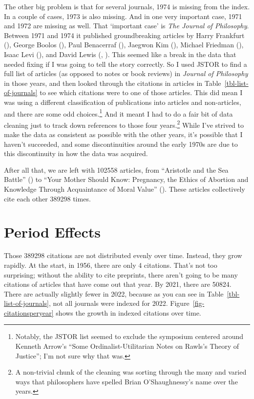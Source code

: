 \documentclass[
  10pt,
  letterpaper,
  DIV=11,
  numbers=noendperiod,
  twoside]{scrartcl}
\begin{document}
The other big problem is that for several journals, 1974 is missing from
the index. In a couple of cases, 1973 is also missing. And in one very
important case, 1971 and 1972 are missing as well. That `important case'
is \emph{The Journal of Philosophy}. Between 1971 and 1974 it published
groundbreaking articles by Harry Frankfurt
(), George Boolos
(), Paul Benacerraf
(), Jaegwon Kim
(), Michael Friedman
(), Isaac Levi
(), and David Lewis
(, ).
This seemed like a break in the data that needed fixing if I was going
to tell the story correctly. So I used JSTOR to find a full list of
articles (as opposed to notes or book reviews) in \emph{Journal of
Philosophy} in those years, and then looked through the citations in
articles in Table~\ref{tbl-list-of-journals} to see which citations were
to one of those articles. This did mean I was using a different
classification of publications into articles and non-articles, and there
are some odd choices.\footnote{Notably, the JSTOR list seemed to exclude
  the symposium centered around Kenneth Arrow's ``Some
  Ordinalist-Utilitarian Notes on Rawls's Theory of Justice''; I'm not
  sure why that was.} And it meant I had to do a fair bit of data
cleaning just to track down references to those four years.\footnote{A
  non-trivial chunk of the cleaning was sorting through the many and
  varied ways that philosophers have spelled Brian O'Shaughnessy's name
  over the years.} While I've strived to make the data as consistent as
possible with the other years, it's possible that I haven't succeeded,
and some discontinuities around the early 1970s are due to this
discontinuity in how the data was acquired.

After all that, we are left with 102558 articles, from ``Aristotle and
the Sea Battle'' () to ``Your
Mother Should Know: Pregnancy, the Ethics of Abortion and Knowledge
Through Acquaintance of Moral Value''
(). These articles collectively
cite each other 389298 times.

\section{Period Effects}\label{sec-period}

Those 389298 citations are not distributed evenly over time. Instead,
they grow rapidly. At the start, in 1956, there are only 4 citations.
That's not too surprising; without the ability to cite preprints, there
aren't going to be many citations of articles that have come out that
year. By 2021, there are 50824. There are actually slightly fewer in
2022, because as you can see in Table~\ref{tbl-list-of-journals}, not
all journals were indexed for 2022. Figure~\ref{fig-citationsperyear}
shows the growth in indexed citations over time.
\end{document}
